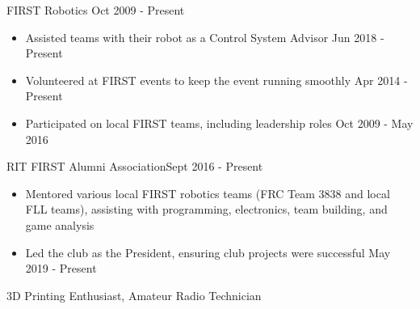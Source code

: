 \documentclass[line,margin]{res}
\newcommand{\ITEMOFFSET}{-8pt}
\begin{document}
\begin{resume}
		FIRST Robotics \hfill Oct 2009 - Present
		\begin{itemize}
			\item Assisted teams with their robot as a Control System Advisor \hfill Jun 2018 - Present
			\item Volunteered at FIRST events to keep the event running smoothly \hfill Apr 2014 - Present
			\item Participated on local FIRST teams, including leadership roles \hfill Oct 2009 - May 2016
		\end{itemize}
		\vspace{\ITEMOFFSET}

		RIT FIRST Alumni Association\hfill Sept 2016 - Present
		\begin{itemize}
			\item Mentored various local FIRST robotics teams (FRC Team 3838 and local FLL teams), assisting with programming, electronics, team building, and game analysis
			\item Led the club as the President, ensuring club projects were successful \hfill May 2019 - Present
		\end{itemize}
		\vspace{\ITEMOFFSET}

		3D Printing Enthusiast,  Amateur Radio Technician
		
\end{resume}
\end{document}

